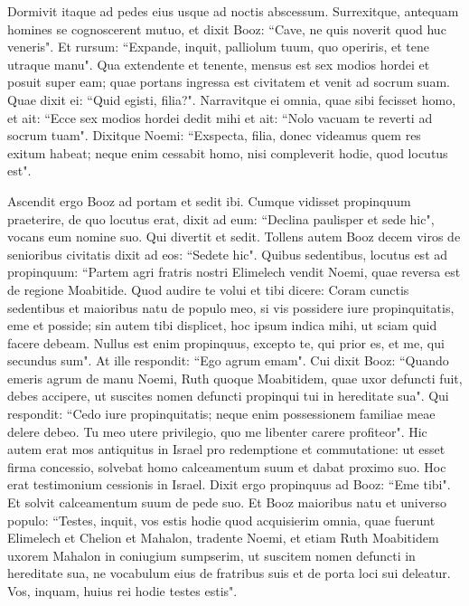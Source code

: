 \begin{biblechapter}
\verse Dormivit itaque ad pedes eius usque ad noctis abscessum. Surrexitque, antequam homines se cognoscerent mutuo, et dixit Booz: “Cave, ne quis noverit quod huc veneris". 
\verse Et rursum: “Expande, inquit, palliolum tuum, quo operiris, et tene utraque manu". Qua extendente et tenente, mensus est sex modios hordei et posuit super eam; quae portans ingressa est civitatem 
\verse et venit ad socrum suam. Quae dixit ei: “Quid egisti, filia?". Narravitque ei omnia, quae sibi fecisset homo, 
\verse et ait: “Ecce sex modios hordei dedit mihi et ait: “Nolo vacuam te reverti ad socrum tuam". 
\verse Dixitque Noemi: “Exspecta, filia, donec videamus quem res exitum habeat; neque enim cessabit homo, nisi compleverit hodie, quod locutus est". 
\end{biblechapter}

\begin{biblechapter}  
\verse Ascendit ergo Booz ad portam et sedit ibi. Cumque vidisset propinquum praeterire, de quo locutus erat, dixit ad eum: “Declina paulisper et sede hic", vocans eum nomine suo. Qui divertit et sedit. 
\verse Tollens autem Booz decem viros de senioribus civitatis dixit ad eos: “Sedete hic". 
\verse Quibus sedentibus, locutus est ad propinquum: “Partem agri fratris nostri Elimelech vendit Noemi, quae reversa est de regione Moabitide. 
\verse Quod audire te volui et tibi dicere: Coram cunctis sedentibus et maioribus natu de populo meo, si vis possidere iure propinquitatis, eme et posside; sin autem tibi displicet, hoc ipsum indica mihi, ut sciam quid facere debeam. Nullus est enim propinquus, excepto te, qui prior es, et me, qui secundus sum". At ille respondit: “Ego agrum emam". 
\verse Cui dixit Booz: “Quando emeris agrum de manu Noemi, Ruth quoque Moabitidem, quae uxor defuncti fuit, debes accipere, ut suscites nomen defuncti propinqui tui in hereditate sua". 
\verse Qui respondit: “Cedo iure propinquitatis; neque enim possessionem familiae meae delere debeo. Tu meo utere privilegio, quo me libenter carere profiteor". 
\verse Hic autem erat mos antiquitus in Israel pro redemptione et commutatione: ut esset firma concessio, solvebat homo calceamentum suum et dabat proximo suo. Hoc erat testimonium cessionis in Israel. 
\verse Dixit ergo propinquus ad Booz: “Eme tibi". Et solvit calceamentum suum de pede suo. 
\verse Et Booz maioribus natu et universo populo: “Testes, inquit, vos estis hodie quod acquisierim omnia, quae fuerunt Elimelech et Chelion et Mahalon, tradente Noemi, 
\verse et etiam Ruth Moabitidem uxorem Mahalon in coniugium sumpserim, ut suscitem nomen defuncti in hereditate sua, ne vocabulum eius de fratribus suis et de porta loci sui deleatur. Vos, inquam, huius rei hodie testes estis". 

\end{biblechapter}
